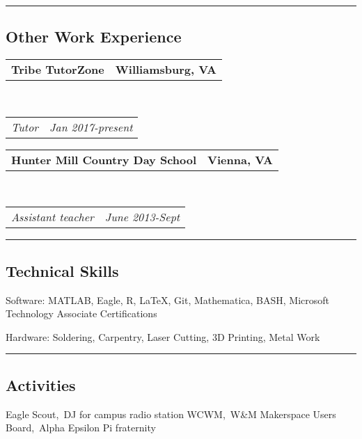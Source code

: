\documentclass[10pt,letterpaper]{article}
\makeatletter
\newenvironment{indentsection}[1]%
{\begin{list}{}%
	{\setlength{\leftmargin}{#1}}%
	\item[]%
}
{\end{list}}
\newcommand{\headerrow}[2]
{\begin{tabular*}{\linewidth}{l@{\extracolsep{\fill}}r}
	#1 &
	#2 \\
\end{tabular*}}
\makeatother
\begin{document}
\hrule
\vspace{-0.4em}
\subsection*{Other Work Experience}

	\headerrow
		{\textbf{Tribe TutorZone}}
		{\textbf{Williamsburg, VA}}
	\\
	\headerrow
		{\emph{Tutor}}
		{\emph{Jan 2017-present}}
	\headerrow
		{\textbf{Hunter Mill Country Day School}}
		{\textbf{Vienna, VA}}
	\\
	\headerrow
		{\emph{Assistant teacher}}
		{\emph{June 2013-Sept}}
	
\hrule
\vspace{-0.4em}
\subsection*{Technical Skills}

\begin{description*}
	\item[Software:]
	MATLAB, Eagle, R, \LaTeX, Git, Mathematica, BASH, Microsoft Technology Associate Certifications
	\item[Hardware:]
	Soldering, Carpentry, Laser Cutting, 3D Printing, Metal Work
\end{description*}

\hrule
\vspace{-0.4em}
\subsection*{Activities}
\indent Eagle Scout,\, DJ for campus radio station WCWM,\, W\&M Makerspace Users Board,\, Alpha Epsilon Pi fraternity
\end{document}
